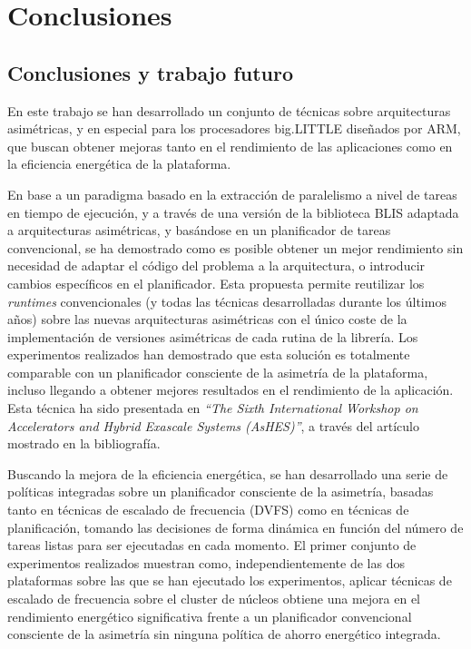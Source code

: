 \cleardoublepage
\chapter{Conclusiones}
\label{ch:chapter6}

\section{Conclusiones y trabajo futuro}

En este trabajo se han desarrollado un conjunto de técnicas sobre
arquitecturas asimétricas, y en especial para los procesadores big.LITTLE
diseñados por ARM, que buscan obtener mejoras tanto en el rendimiento de las
aplicaciones como en la eficiencia energética de la plataforma.

En base a un paradigma basado en la extracción de paralelismo a nivel de
tareas en tiempo de ejecución, y a través de una versión de la biblioteca
BLIS adaptada a arquitecturas asimétricas, y basándose en un planificador
de tareas convencional, se ha demostrado como es posible obtener un mejor
rendimiento sin necesidad de adaptar el código del problema a la
arquitectura, o introducir cambios específicos en el planificador. Esta
propuesta permite reutilizar los \emph{runtimes} convencionales (y todas
las técnicas desarrolladas durante los últimos años) sobre las nuevas
arquitecturas asimétricas con el único coste de la implementación de
versiones asimétricas de cada rutina de la librería.  Los experimentos
realizados han demostrado que esta solución es totalmente comparable con un
planificador consciente de la asimetría de la plataforma, incluso llegando
a obtener mejores resultados en el rendimiento de la aplicación. Esta
técnica ha sido presentada en \emph{``The Sixth International Workshop on
  Accelerators and Hybrid Exascale Systems (AsHES)''}, a través del
artículo~\cite{ashes} mostrado en la bibliografía.

Buscando la mejora de la eficiencia energética, se han desarrollado una
serie de políticas integradas sobre un planificador consciente de la
asimetría, basadas tanto en técnicas de escalado de frecuencia (DVFS) como
en técnicas de planificación, tomando las decisiones de forma dinámica en
función del número de tareas listas para ser ejecutadas en cada momento. El
primer conjunto de experimentos realizados muestran como,
independientemente de las dos plataformas sobre las que se han ejecutado
los experimentos, aplicar técnicas de escalado de frecuencia sobre el
cluster de núcleos \BIG obtiene una mejora en el rendimiento energético
significativa frente a un planificador convencional consciente de la
asimetría sin ninguna política de ahorro energético integrada.

